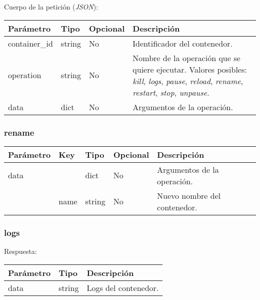 		Cuerpo de la petición (\textit{JSON}):
		\begin{table}[h!]
			\centering
	\begin{adjustbox}{max width=\textwidth}
			\begin{tabularx}{\linewidth}{|l|l|l|L|}
				\hline
				Parámetro & Tipo & Opcional & Descripción \\ \hline
				container\_id & string & No & Identificador del contenedor. \\ \hline
				operation & string & No & Nombre de la operación que se quiere ejecutar. Valores posibles: \textit{kill}, \textit{logs}, \textit{pause}, \textit{reload}, \textit{rename}, \textit{restart}, \textit{stop}, \textit{unpause}. \\ \hline
				data & dict & No & Argumentos de la operación. \\ \hline
			\end{tabularx}
\end{adjustbox}
		\end{table}
	
		
		\subsubsection{rename}
			\begin{table}[h!]
				\centering
	\begin{adjustbox}{max width=\textwidth}
				\begin{tabular}{|l|l|l|l|l|}
					\hline
					Parámetro & Key & Tipo & Opcional & Descripción \\ \hline
					data &  & dict & No & Argumentos de la operación. \\ \hline
					& name & string & No & Nuevo nombre del contenedor. \\ \hline
				\end{tabular}
\end{adjustbox}
			\end{table}
		
		\subsubsection{logs}
			Respuesta:
			
			\begin{table}[h!]
				\centering
	\begin{adjustbox}{max width=\textwidth}
				\begin{tabular}{|l|l|l|}
					\hline
					Parámetro & Tipo & Descripción \\ \hline
					data & string & Logs del contenedor. \\ \hline
				\end{tabular}
\end{adjustbox}
			\end{table}
		
